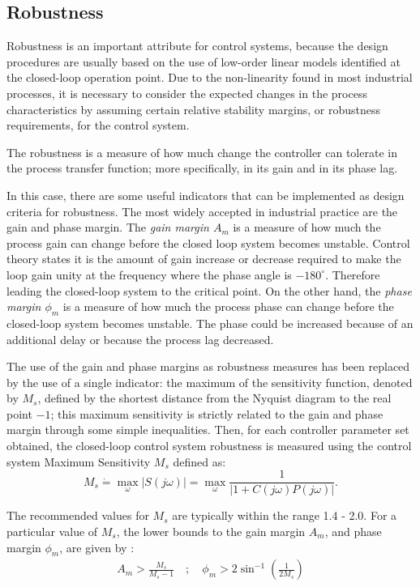 \subsection{Robustness}
%
Robustness is an important attribute for control systems, because the design procedures are usually based on the use of low-order linear models identified at the closed-loop operation point. Due to the non-linearity found in most industrial processes, it is necessary to consider the expected changes in the process characteristics by assuming certain relative stability margins, or robustness requirements, for the control system.

The robustness is a measure of how much change the controller can tolerate in the process transfer function; more specifically, in its gain and in its phase lag.

In this case, there are some useful indicators that can be implemented as design criteria for robustness. The most widely accepted in industrial practice are the gain and phase margin. The \emph{gain margin $A_m$} is a measure of how much the process gain can change before the closed loop system becomes unstable. Control theory states it is the amount of gain increase or decrease required to make the loop gain unity at the frequency where the phase angle is $-180^\circ$. Therefore leading the closed-loop system to the critical point. On the other hand, the \emph{phase margin $\phi_m$} is a measure of how much the process phase can change before the closed-loop system becomes unstable. The phase could be increased because of an additional delay or because the process lag decreased.

The use of the gain and phase margins as robustness measures has been replaced by the use of a single indicator: the maximum of the sensitivity function, denoted by $M_s$, defined by the shortest distance from the Nyquist diagram to the real point $-1$; this maximum sensitivity is strictly related to the gain and phase margin through some simple inequalities. Then, for each controller parameter set obtained, the closed-loop control system robustness is measured using the control system Maximum Sensitivity $M_s$ defined as:
%
\begin{equation}
M_{s} \dot{=} \max_{\omega} \left|S(j \omega)\right| = \max_{\omega} \frac{1}{\left|1+C(j \omega) P(j \omega)\right|}.
\label{Eq:Ms}
\end{equation}

The recommended values for $M_s$ are typically within the range 1.4 - 2.0. For a particular value of $M_s$, the lower bounds to the gain margin $A_m$, and phase margin $\phi_m$, are given by \citep{astromhagglund2006}:
%
\begin{eqnarray*}
    A_m > \frac{M_s}{M_s-1} \quad ; \quad \phi_m > 2 \sin^{-1} \left(\frac{1}{2 M_s} \right)
\end{eqnarray*}

